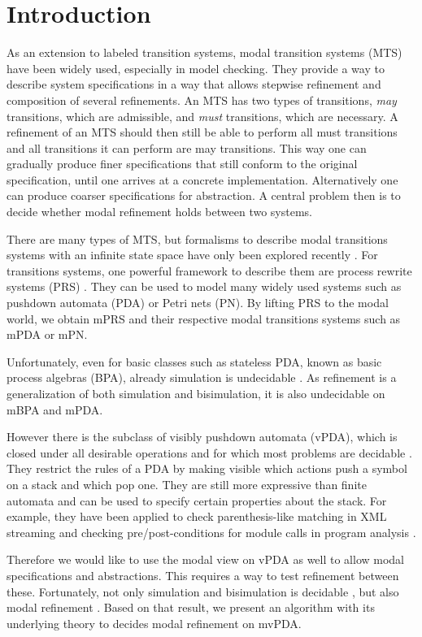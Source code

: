 
\newpage

\chapter{Introduction}

As an extension to labeled transition systems,
modal transition systems (MTS) \cite{LarsenT88}
have been widely used, especially in model checking.
They provide a way to describe system specifications
in a way that allows stepwise refinement
and composition of several refinements.
An MTS has two types of transitions, \emph{may} transitions, which are admissible,
and \emph{must} transitions, which are necessary.
A refinement of an MTS should then still be able to perform
all must transitions and all transitions it can perform are may transitions.
This way one can gradually produce finer specifications that still conform
to the original specification, until one arrives at a concrete implementation.
Alternatively one can produce coarser specifications for abstraction.
A central problem then is to decide whether modal refinement holds between
two systems.

There are many types of MTS, 
but formalisms to describe modal transitions systems with
an infinite state space have only been explored recently \cite{BenesK12}.
For transitions systems, one powerful framework to describe them are
process rewrite systems (PRS) \cite{Mayr00, Esparza01}.
They can be used to model many widely used systems
such as pushdown automata (PDA) or Petri nets (PN).
By lifting PRS to the modal world, we obtain mPRS
and their respective modal transitions systems such as
mPDA or mPN.

Unfortunately, even for basic classes such as
stateless PDA, known as basic process algebras (BPA), already simulation is
undecidable \cite{GrooteH94}.
As refinement is a generalization of both simulation and bisimulation,
it is also undecidable on mBPA and mPDA.

However there is the subclass of visibly pushdown automata (vPDA),
which is closed under all desirable operations
and for which most problems are decidable \cite{AlurM04}.
They restrict the rules of a PDA by making visible which
actions push a symbol on a stack and which pop one.
They are still more expressive than finite automata 
and can be used to specify certain properties about the stack.
For example, they have been applied to check
parenthesis-like matching in XML streaming
\cite{KumarMV07}
and checking pre/post-conditions for module calls
in program analysis \cite{AlurEM04}.

Therefore we would like to use the modal view on vPDA
as well to allow modal specifications and abstractions.
This requires a way to test refinement between these.
Fortunately, not only simulation and bisimulation
is decidable \cite{Srba06},
but also modal refinement \cite{BenesK12}.
Based on that result, we present
an algorithm with its underlying theory
to decides modal refinement on mvPDA.



